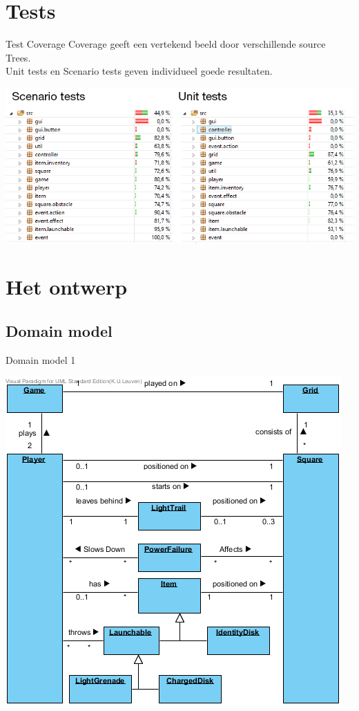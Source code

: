 \documentclass[t]{beamer}
\begin{document}
\section{Tests}
\begin{frame}{Test Coverage}
Coverage geeft een vertekend beeld door verschillende source Trees.\\
Unit tests en Scenario tests geven individueel goede resultaten.
\begin{center}
\includegraphics[scale=0.5]{images/test}
\end{center}
\end{frame}

\section{Het ontwerp}

\subsection{Domain model}

\begin{frame}{Domain model 1}
\begin{center}
\includegraphics[scale=0.45]{images/DomainModel1}
\end{center}
\end{frame}
\end{document}
